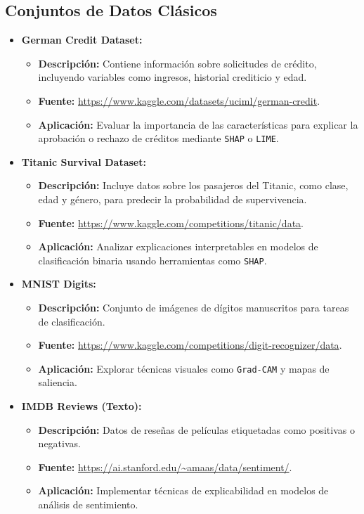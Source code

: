 \begin{refsection}
\subsection{Conjuntos de Datos Clásicos}
\begin{itemize}
    \item \textbf{German Credit Dataset:}
    \begin{itemize}
        \item \textbf{Descripción:} Contiene información sobre solicitudes de crédito, incluyendo variables como ingresos, historial crediticio y edad.
        \item \textbf{Fuente:} \url{https://www.kaggle.com/datasets/uciml/german-credit}.
        \item \textbf{Aplicación:} Evaluar la importancia de las características para explicar la aprobación o rechazo de créditos mediante \texttt{SHAP} o \texttt{LIME}.
    \end{itemize}
    
    \item \textbf{Titanic Survival Dataset:}
    \begin{itemize}
        \item \textbf{Descripción:} Incluye datos sobre los pasajeros del Titanic, como clase, edad y género, para predecir la probabilidad de supervivencia.
        \item \textbf{Fuente:} \url{https://www.kaggle.com/competitions/titanic/data}.
        \item \textbf{Aplicación:} Analizar explicaciones interpretables en modelos de clasificación binaria usando herramientas como \texttt{SHAP}.
    \end{itemize}
    
    \item \textbf{MNIST Digits:}
    \begin{itemize}
        \item \textbf{Descripción:} Conjunto de imágenes de dígitos manuscritos para tareas de clasificación.
        \item \textbf{Fuente:} \url{https://www.kaggle.com/competitions/digit-recognizer/data}.
        \item \textbf{Aplicación:} Explorar técnicas visuales como \texttt{Grad-CAM} y mapas de saliencia.
    \end{itemize}
    
    \item \textbf{IMDB Reviews (Texto):}
    \begin{itemize}
        \item \textbf{Descripción:} Datos de reseñas de películas etiquetadas como positivas o negativas.
        \item \textbf{Fuente:} \url{https://ai.stanford.edu/~amaas/data/sentiment/}.
        \item \textbf{Aplicación:} Implementar técnicas de explicabilidad en modelos de análisis de sentimiento.
    \end{itemize}
\end{itemize}


\end{refsection}
